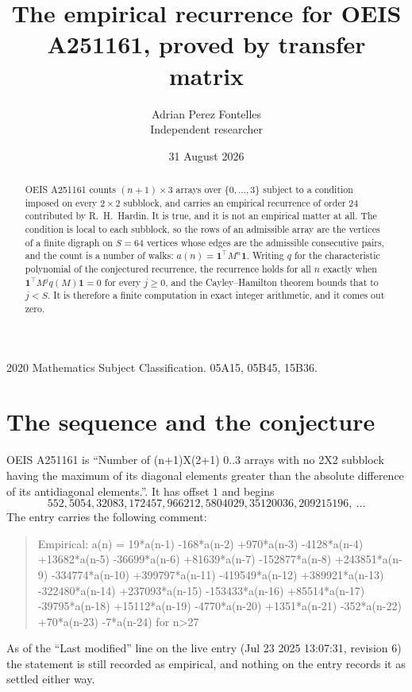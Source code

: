 \documentclass[11pt,a4paper]{article}
\title{The empirical recurrence for OEIS A251161, proved by transfer matrix}
\author{Adrian Perez Fontelles\\ \small Independent researcher}
\date{31 August 2026}
\theoremstyle{plain}
\theoremstyle{definition}
\begin{document}
\maketitle

\begin{abstract}
OEIS A251161 counts $(n+1)\times3$ arrays over $\{0,\dots,3\}$ subject to a condition imposed on
every $2\times2$ subblock, and carries an empirical recurrence of order $24$ contributed
by R.~H.~Hardin. It is true, and it is not an empirical matter at all. The condition is local
to each subblock, so the rows of an admissible array are the vertices of a finite digraph
on $S=64$ vertices whose edges are the admissible consecutive pairs, and the count is a
number of walks: $a(n)=\mathbf{1}^{\!\top}M^{n}\mathbf{1}$. Writing $q$
for the characteristic polynomial of the conjectured recurrence, the recurrence holds for all
$n$ exactly when $\mathbf{1}^{\!\top}M^{j}q(M)\mathbf{1}=0$ for every $j\ge0$, and the
Cayley--Hamilton theorem bounds that to $j<S$. It is therefore a finite computation in exact
integer arithmetic, and it comes out zero.
\end{abstract}

\noindent\small 2020 Mathematics Subject Classification. 05A15, 05B45, 15B36.\normalsize

\section{The sequence and the conjecture}

OEIS A251161 is ``Number of (n+1)X(2+1) 0..3 arrays with no 2X2 subblock having the maximum of its diagonal elements greater than the absolute difference of its antidiagonal elements.''. It has offset $1$ and begins
\[
552, 5054, 32083, 172457, 966212, 5804029, 35120036, 209215196,\ \dots
\]
The entry carries the following comment:
\begin{quote}\small
Empirical: a(n) = 19*a(n-1) -168*a(n-2) +970*a(n-3) -4128*a(n-4) +13682*a(n-5) -36699*a(n-6) +81639*a(n-7) -152877*a(n-8) +243851*a(n-9) -334774*a(n-10) +399797*a(n-11) -419549*a(n-12) +389921*a(n-13) -322480*a(n-14) +237093*a(n-15) -153433*a(n-16) +85514*a(n-17) -39795*a(n-18) +15112*a(n-19) -4770*a(n-20) +1351*a(n-21) -352*a(n-22) +70*a(n-23) -7*a(n-24) for n>27
\end{quote}
As of the ``Last modified'' line on the live entry (Jul 23 2025 13:07:31, revision 6) the statement is
still recorded as empirical, and nothing on the entry records it as settled either way.
\end{document}
